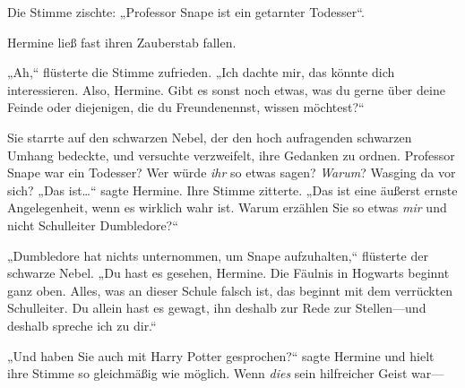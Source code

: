 Die Stimme zischte: „Professor Snape ist ein getarnter Todesser“.

Hermine ließ fast ihren Zauberstab fallen.

„Ah,“ flüsterte die Stimme zufrieden. „Ich dachte mir, das könnte dich interessieren. Also, Hermine. Gibt es sonst noch etwas, was du gerne über deine Feinde oder diejenigen, die du Freundenennst, wissen möchtest?“

Sie starrte auf den schwarzen Nebel, der den hoch aufragenden schwarzen Umhang bedeckte, und versuchte verzweifelt, ihre Gedanken zu ordnen. Professor Snape war ein Todesser? Wer würde \emph{ihr} so etwas sagen? \emph{Warum}? Wasging da vor sich? „Das ist…“ sagte Hermine. Ihre Stimme zitterte. „Das ist eine äußerst ernste Angelegenheit, wenn es wirklich wahr ist. Warum erzählen Sie so etwas \emph{mir} und nicht Schulleiter Dumbledore?“

„Dumbledore hat nichts unternommen, um Snape aufzuhalten,“ flüsterte der schwarze Nebel. „Du hast es gesehen, Hermine. Die Fäulnis in Hogwarts beginnt ganz oben. Alles, was an dieser Schule falsch ist, das beginnt mit dem verrückten Schulleiter. Du allein hast es gewagt, ihn deshalb zur Rede zur Stellen—und deshalb spreche ich zu dir.“

„Und haben Sie auch mit Harry Potter gesprochen?“ sagte Hermine und hielt ihre Stimme so gleichmäßig wie möglich. Wenn \emph{dies} sein hilfreicher Geist war—

